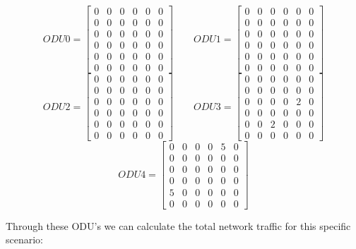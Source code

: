 \[
ODU0=
\begin{bmatrix}
0 & 0 & 0 & 0 & 0 & 0 \\
0 & 0 & 0 & 0 & 0 & 0 \\
0 & 0 & 0 & 0 & 0 & 0 \\
0 & 0 & 0 & 0 & 0 & 0 \\
0 & 0 & 0 & 0 & 0 & 0 \\
0 & 0 & 0 & 0 & 0 & 0
\end{bmatrix}
\qquad ODU1=
\begin{bmatrix}
0 & 0 & 0 & 0 & 0 & 0 \\
0 & 0 & 0 & 0 & 0 & 0 \\
0 & 0 & 0 & 0 & 0 & 0 \\
0 & 0 & 0 & 0 & 0 & 0 \\
0 & 0 & 0 & 0 & 0 & 0 \\
0 & 0 & 0 & 0 & 0 & 0
\end{bmatrix}
\]
\[
ODU2=
\begin{bmatrix}
0 & 0 & 0 & 0 & 0 & 0 \\
0 & 0 & 0 & 0 & 0 & 0 \\
0 & 0 & 0 & 0 & 0 & 0 \\
0 & 0 & 0 & 0 & 0 & 0 \\
0 & 0 & 0 & 0 & 0 & 0 \\
0 & 0 & 0 & 0 & 0 & 0
\end{bmatrix}
\qquad ODU3=
\begin{bmatrix}
0 & 0 & 0 & 0 & 0 & 0 \\
0 & 0 & 0 & 0 & 0 & 0 \\
0 & 0 & 0 & 0 & 2 & 0 \\
0 & 0 & 0 & 0 & 0 & 0 \\
0 & 0 & 2 & 0 & 0 & 0 \\
0 & 0 & 0 & 0 & 0 & 0
\end{bmatrix}
\]
\[
ODU4=
\begin{bmatrix}
0 & 0 & 0 & 0 & 5 & 0 \\
0 & 0 & 0 & 0 & 0 & 0 \\
0 & 0 & 0 & 0 & 0 & 0 \\
0 & 0 & 0 & 0 & 0 & 0 \\
5 & 0 & 0 & 0 & 0 & 0 \\
0 & 0 & 0 & 0 & 0 & 0
\end{bmatrix}
\]

\vspace{17pt}
Through these ODU's we can calculate the total network traffic for this specific scenario:\\

